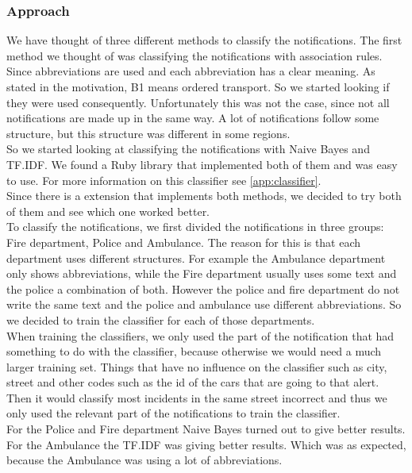 \subsubsection*{Approach}
We have thought of three different methods to classify the notifications.
The first method we thought of was classifying the notifications with association rules.
Since abbreviations are used and each abbreviation has a clear meaning. 
As stated in the motivation, B1 means ordered transport. 
So we started looking if they were used consequently. 
Unfortunately this was not the case, since not all notifications are made up in the same way. 
A lot of notifications follow some structure, but this structure was different in some regions. \\
So we started looking at classifying the notifications with Naive Bayes and TF.IDF. 
We found a Ruby library that implemented both of them and was easy to use. 
For more information on this classifier see \autoref{app:classifier}. \\
Since there is a extension that implements both methods, we decided to try both of them and see which one worked better.\\
To classify the notifications, we first divided the notifications in three groups: Fire department, Police and Ambulance.
The reason for this is that each department uses different structures. For example the Ambulance department only shows abbreviations, while the Fire department usually  uses some text and the police a combination of both. 
However the police and fire department do not write the same text and the police and ambulance use different abbreviations. So we decided to train the classifier for each of those departments. \\
When training the classifiers, we only used the part of the notification that had something to do with the classifier, because otherwise we would need a much larger training set. 
Things that have no influence on the classifier such as city, street and other codes such as the id of the cars that are going to that alert. Then it would classify most incidents in the same street incorrect and thus we only used the relevant part of the notifications to train the classifier. \\
For the Police and Fire department Naive Bayes turned out to give better results. For the Ambulance the TF.IDF was giving better results. Which was as expected, because the Ambulance was using a lot of abbreviations. 

